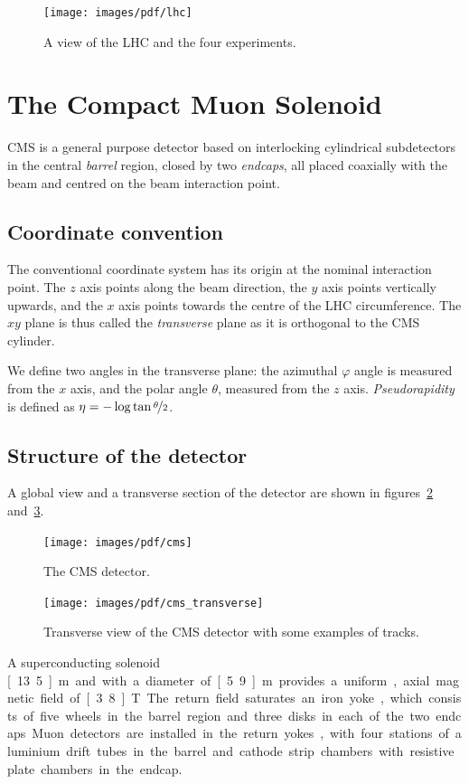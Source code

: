 \begin{figure}[htb]
    \centering
    \texttt{[image: images/pdf/lhc]}

    \caption{A view of the LHC and the four experiments.}
    \label{fig:lhc}
\end{figure}

\section{The Compact Muon Solenoid}
CMS is a general purpose detector based on interlocking cylindrical
subdetectors in the central \emph{barrel} region, closed by two
\emph{endcaps}, all placed coaxially with the beam and centred on the beam interaction point.
\subsection{Coordinate convention}
The conventional coordinate system has its origin at the nominal interaction
point. The $z$ axis points along the beam direction, the $y$ axis points
vertically upwards, and the $x$ axis points towards the centre of the LHC
circumference. The $xy$ plane is thus called the \emph{transverse} plane as
it is orthogonal to the CMS cylinder.

We define two angles in the transverse plane: the azimuthal $\varphi$ angle
is measured from the $x$ axis, and the polar angle $\theta$, measured from
the $z$ axis.
\emph{Pseudorapidity} is defined as $\eta = -\log \tan
\nicefrac{\theta}{2}$.

\subsection{Structure of the detector}
A global view and a transverse section of the detector are shown in
figures~\ref{fig:cms} and~\ref{fig:cms_transverse}.

\begin{figure}[htb]
    \centering
    \texttt{[image: images/pdf/cms]}
    \caption{The CMS detector.}
    \label{fig:cms}
\end{figure}

\begin{figure}[htb]
    \centering
    \texttt{[image: images/pdf/cms\_transverse]}
    \caption{Transverse view of the CMS detector with some examples of tracks.}
    \label{fig:cms_transverse}
\end{figure}

A superconducting solenoid \unit[13.5]{m} and with a diameter of
\unit[5.9]{m} provides a uniform, axial magnetic field of \unit[3.8]{T}.
The return field saturates an iron yoke, which consists of five wheels in
the barrel region and three disks in each of the two endcaps.
Muon detectors are installed in the return yokes, with four stations of
aluminium drift tubes in the barrel and cathode strip chambers with
resistive plate chambers in the endcap.

